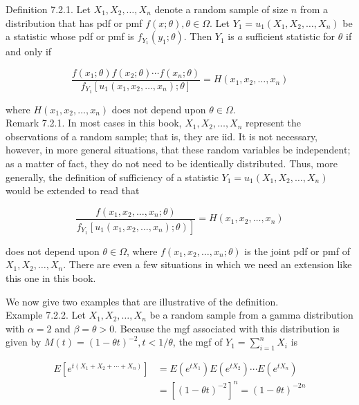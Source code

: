 Definition 7.2.1. Let $X_{1}, X_{2}, \ldots, X_{n}$ denote a random sample of size $n$ from a distribution that has pdf or pmf $f(x ; \theta), \theta \in \Omega$. Let $Y_{1}=u_{1}\left(X_{1}, X_{2}, \ldots, X_{n}\right)$ be a statistic whose pdf or pmf is $f_{Y_{1}}\left(y_{1} ; \theta\right)$. Then $Y_{1}$ is $a$ sufficient statistic for $\theta$ if and only if

$$
\frac{f\left(x_{1} ; \theta\right) f\left(x_{2} ; \theta\right) \cdots f\left(x_{n} ; \theta\right)}{f_{Y_{1}}\left[u_{1}\left(x_{1}, x_{2}, \ldots, x_{n}\right) ; \theta\right]}=H\left(x_{1}, x_{2}, \ldots, x_{n}\right)
$$

where $H\left(x_{1}, x_{2}, \ldots, x_{n}\right)$ does not depend upon $\theta \in \Omega$.\\
Remark 7.2.1. In most cases in this book, $X_{1}, X_{2}, \ldots, X_{n}$ represent the observations of a random sample; that is, they are iid. It is not necessary, however, in more general situations, that these random variables be independent; as a matter of fact, they do not need to be identically distributed. Thus, more generally, the definition of sufficiency of a statistic $Y_{1}=u_{1}\left(X_{1}, X_{2}, \ldots, X_{n}\right)$ would be extended to read that

$$
\frac{f\left(x_{1}, x_{2}, \ldots, x_{n} ; \theta\right)}{\left.f_{Y_{1}}\left[u_{1}\left(x_{1}, x_{2}, \ldots, x_{n}\right) ; \theta\right)\right]}=H\left(x_{1}, x_{2}, \ldots, x_{n}\right)
$$

does not depend upon $\theta \in \Omega$, where $f\left(x_{1}, x_{2}, \ldots, x_{n} ; \theta\right)$ is the joint pdf or pmf of $X_{1}, X_{2}, \ldots, X_{n}$. There are even a few situations in which we need an extension like this one in this book.

We now give two examples that are illustrative of the definition.\\
Example 7.2.2. Let $X_{1}, X_{2}, \ldots, X_{n}$ be a random sample from a gamma distribution with $\alpha=2$ and $\beta=\theta>0$. Because the mgf associated with this distribution is given by $M(t)=(1-\theta t)^{-2}, t<1 / \theta$, the mgf of $Y_{1}=\sum_{i=1}^{n} X_{i}$ is

$$
\begin{aligned}
E\left[e^{t\left(X_{1}+X_{2}+\cdots+X_{n}\right)}\right] & =E\left(e^{t X_{1}}\right) E\left(e^{t X_{2}}\right) \cdots E\left(e^{t X_{n}}\right) \\
& =\left[(1-\theta t)^{-2}\right]^{n}=(1-\theta t)^{-2 n}
\end{aligned}
$$


